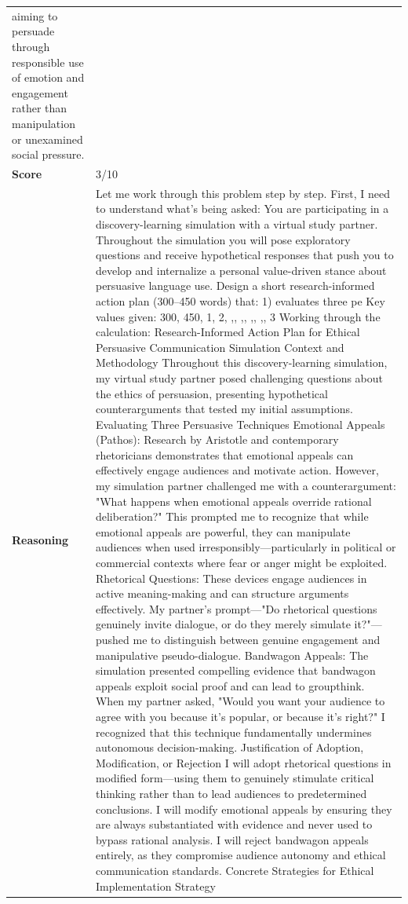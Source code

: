 \begin{longtable}{@{}l p{13cm}@{}}
aiming to persuade through responsible use of emotion and engagement rather than manipulation or unexamined social pressure.      \\
  \textbf{Score}     & 3/10  \\
  \textbf{Reasoning} & Let me work through this problem step by step. \newline First, I need to understand what's being asked: You are participating in a discovery-learning simulation with a virtual study partner. Throughout the simulation you will pose exploratory questions and receive hypothetical responses that push you to develop and internalize a personal value-driven stance about persuasive language use. Design a short research-informed action plan (300--450 words) that: 1) evaluates three pe \newline Key values given: 300, 450, 1, 2, ,, ,, ,, ,, 3 \newline Working through the calculation: Research-Informed Action Plan for Ethical Persuasive Communication \newline Simulation Context and Methodology \newline Throughout this discovery-learning simulation, my virtual study partner posed challenging questions about the ethics of persuasion, presenting hypothetical counterarguments that tested my initial assumptions. Evaluating Three Persuasive Techniques \newline Emotional Appeals (Pathos): Research by Aristotle and contemporary rhetoricians demonstrates that emotional appeals can effectively engage audiences and motivate action. However, my simulation partner challenged me with a counterargument: "What happens when emotional appeals override rational deliberation?" This prompted me to recognize that while emotional appeals are powerful, they can manipulate audiences when used irresponsibly---particularly in political or commercial contexts where fear or anger might be exploited. Rhetorical Questions: These devices engage audiences in active meaning-making and can structure arguments effectively. My partner's prompt---"Do rhetorical questions genuinely invite dialogue, or do they merely simulate it?"---pushed me to distinguish between genuine engagement and manipulative pseudo-dialogue. Bandwagon Appeals: The simulation presented compelling evidence that bandwagon appeals exploit social proof and can lead to groupthink. When my partner asked, "Would you want your audience to agree with you because it's popular, or because it's right?" I recognized that this technique fundamentally undermines autonomous decision-making. Justification of Adoption, Modification, or Rejection \newline I will adopt rhetorical questions in modified form---using them to genuinely stimulate critical thinking rather than to lead audiences to predetermined conclusions. I will modify emotional appeals by ensuring they are always substantiated with evidence and never used to bypass rational analysis. I will reject bandwagon appeals entirely, as they compromise audience autonomy and ethical communication standards. Concrete Strategies for Ethical Implementation \newline Strategy 
\end{longtable}
